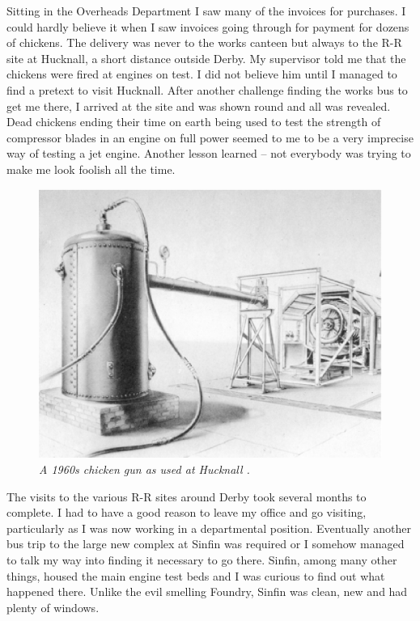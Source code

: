 Sitting in the Overheads Department I saw many of the invoices for
purchases. I could hardly believe it when I saw invoices going through
for payment for dozens of chickens. The delivery was never to the
works canteen but always to the R-R site at Hucknall, a short distance
outside Derby. My supervisor told me that the chickens were fired at
engines on test. I did not believe him until I managed to find a
pretext to visit Hucknall. After another challenge finding the works
bus to get me there, I arrived at the site and was shown round and all
was revealed. Dead chickens ending their time on earth being used to
test the strength of compressor blades in an engine on full power
seemed to me to be a very imprecise way of testing a jet
engine. Another lesson learned -- not everybody was trying to make me
look foolish all the time.

\begin{figure}[htbp]
   \vspace{2em}
   \centering
   \includegraphics[scale=0.5]{bird_gun.eps}
   \caption*{\small \em A 1960s chicken gun as used at Hucknall .}
   \label{fig:birdgun}
\end{figure}

The visits to the various R-R sites around Derby took several months
to complete. I had to have a good reason to leave my office and go
visiting, particularly as I was now working in a departmental
position. Eventually another bus trip to the large new complex at
Sinfin was required or I somehow managed to talk my way into finding
it necessary to go there. Sinfin, among many other things, housed the
main engine test beds and I was curious to find out what happened
there. Unlike the evil smelling Foundry, Sinfin was clean, new and had
plenty of windows.

